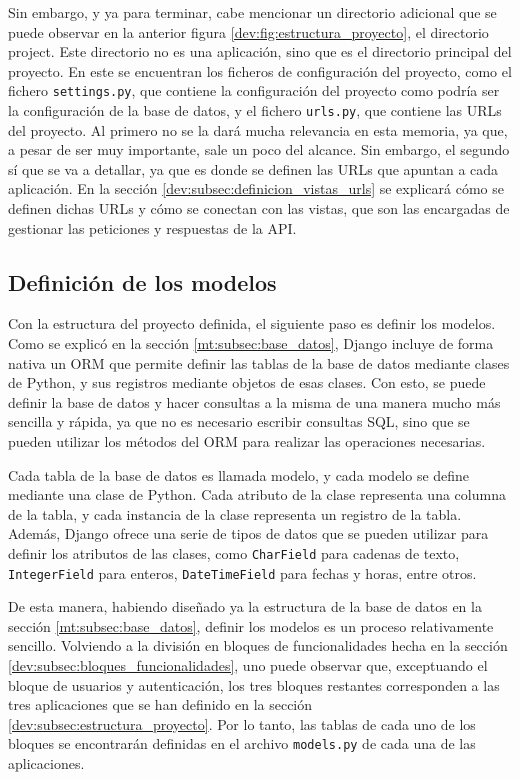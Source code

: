 Sin embargo, y ya para terminar, cabe mencionar un directorio adicional que se puede observar en la anterior figura \ref{dev:fig:estructura_proyecto}, el directorio project. Este directorio no es una aplicación, sino que es el directorio principal del proyecto. En este se encuentran los ficheros de configuración del proyecto, como el fichero \texttt{settings.py}, que contiene la configuración del proyecto como podría ser la configuración de la base de datos, y el fichero \texttt{urls.py}, que contiene las URLs del proyecto. Al primero no se la dará mucha relevancia en esta memoria, ya que, a pesar de ser muy importante, sale un poco del alcance. Sin embargo, el segundo sí que se va a detallar, ya que es donde se definen las URLs que apuntan a cada aplicación. En la sección \ref{dev:subsec:definicion_vistas_urls} se explicará cómo se definen dichas URLs y cómo se conectan con las vistas, que son las encargadas de gestionar las peticiones y respuestas de la API.

\subsection{Definición de los modelos}
\label{dev:subsec:definicion_modelos}

Con la estructura del proyecto definida, el siguiente paso es definir los modelos. Como se explicó en la sección \ref{mt:subsec:base_datos}, Django incluye de forma nativa un ORM que permite definir las tablas de la base de datos mediante clases de Python, y sus registros mediante objetos de esas clases. Con esto, se puede definir la base de datos y hacer consultas a la misma de una manera mucho más sencilla y rápida, ya que no es necesario escribir consultas SQL, sino que se pueden utilizar los métodos del ORM para realizar las operaciones necesarias.

Cada tabla de la base de datos es llamada modelo, y cada modelo se define mediante una clase de Python. Cada atributo de la clase representa una columna de la tabla, y cada instancia de la clase representa un registro de la tabla. Además, Django ofrece una serie de tipos de datos que se pueden utilizar para definir los atributos de las clases, como \texttt{CharField} para cadenas de texto, \texttt{IntegerField} para enteros, \texttt{DateTimeField} para fechas y horas, entre otros.

De esta manera, habiendo diseñado ya la estructura de la base de datos en la sección \ref{mt:subsec:base_datos}, definir los modelos es un proceso relativamente sencillo. Volviendo a la división en bloques de funcionalidades hecha en la sección \ref{dev:subsec:bloques_funcionalidades}, uno puede observar que, exceptuando el bloque de usuarios y autenticación, los tres bloques restantes corresponden a las tres aplicaciones que se han definido en la sección \ref{dev:subsec:estructura_proyecto}. Por lo tanto, las tablas de cada uno de los bloques se encontrarán definidas en el archivo \texttt{models.py} de cada una de las aplicaciones.

